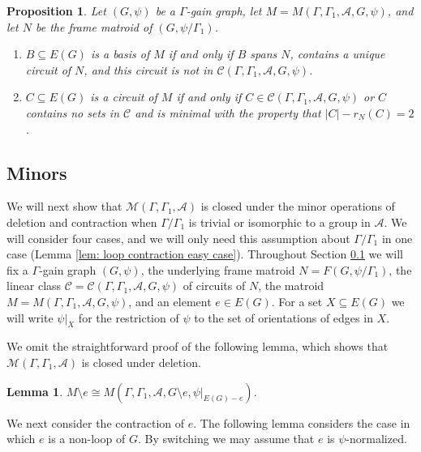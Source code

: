 \documentclass[12pt]{article}
\newtheorem{lemma}[theorem]{Lemma}
\newtheorem{proposition}[theorem]{Proposition}
\theoremstyle{definition}
\newcommand{\cA}{\mathcal{A}}
\newcommand{\cC}{\mathcal{C}}
\newcommand{\cM}{\mathcal{M}}
\newcommand{\del}{\!\setminus\!}
\begin{document}
\begin{proposition} \label{prop: bases and circuits}
Let $(G, \psi)$ be a $\Gamma$-gain graph, let $M = M(\Gamma, \Gamma_1, \cA, G, \psi)$, and let $N$ be the frame matroid of $(G, \psi/\Gamma_1)$.
\begin{enumerate}[label=$(\alph*)$]
    \item $B \subseteq E(G)$ is a basis of $M$ if and only if $B$ spans $N$, contains a unique circuit of $N$, and this circuit is not in $\cC(\Gamma, \Gamma_1, \cA, G, \psi)$.

    \item $C \subseteq E(G)$ is a circuit of $M$ if and only if $C \in \cC(\Gamma, \Gamma_1, \cA, G, \psi)$ or $C$ contains no sets in $\cC$ and is minimal with the property that $|C| - r_N(C) = 2$.
\end{enumerate}
\end{proposition}








\subsection{Minors} \label{sec: minors}

We will next show that $\cM(\Gamma, \Gamma_1, \cA)$ is closed under the minor operations of deletion and contraction when $\Gamma/\Gamma_1$ is trivial or isomorphic to a group in $\cA$.
We will consider four cases, and we will only need this assumption about $\Gamma/\Gamma_1$ in one case (Lemma \ref{lem: loop contraction easy case}).
Throughout Section \ref{sec: minors} we will fix a $\Gamma$-gain graph $(G, \psi)$, the underlying frame matroid $N = F(G, \psi/\Gamma_1)$, the linear class $\cC = \cC(\Gamma, \Gamma_1, \cA, G, \psi)$ of circuits of $N$, the matroid $M = M(\Gamma, \Gamma_1, \cA, G, \psi)$, and an element $e \in E(G)$.
For a set $X \subseteq E(G)$ we will write $\psi|_{X}$ for the restriction of $\psi$ to the set of orientations of edges in $X$.

We omit the straightforward proof of the following lemma, which shows that $\cM(\Gamma, \Gamma_1, \cA)$ is closed under deletion.

\begin{lemma} \label{lem: deletion}
$M \del e \cong M(\Gamma, \Gamma_1, \cA, G\del e, \psi|_{E(G) - e})$.
\end{lemma}



We next consider the contraction of $e$.
The following lemma considers the case in which $e$ is a non-loop of $G$.
By switching we may assume that $e$ is $\psi$-normalized.
\end{document}
